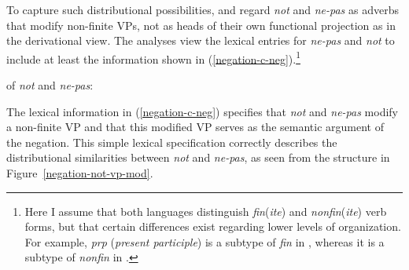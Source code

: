 \documentclass[output=paper,biblatex,babelshorthands,newtxmath,draftmode,colorlinks,citecolor=brown]{langscibook}
\begin{document}
\begin{exe}
\begin{xlist}
\begin{exe}
\begin{xlist}
\noindent
To capture such distributional possibilities, \citet{Kim:00} and \citet{KS:02} regard \textit{not} and \textit{ne-pas} as adverbs that modify
non-finite VPs, not as  heads of their own functional projection as in the derivational view. The
analyses view the lexical entries for \textit{ne-pas} and \textit{not} to include at
least the
information shown in (\ref{negation-c-neg}).\footnote{Here I assume that both languages
distinguish \textit{fin}(\textit{ite}) and \textit{nonfin}(\textit{ite}) verb forms, but that
certain differences exist regarding lower levels of organization. For example,
\textit{prp} (\textit{present participle}) is a subtype of \textit{fin} in ,
whereas it is a subtype of \textit{nonfin} in .}


\ea
\label{negation-c-neg}
\localvs of \emph{not} and \emph{ne-pas}:\\
\z

\noindent %
The lexical information in (\ref{negation-c-neg}) specifies that
\textit{not} and \textit{ne-pas} modify a non-finite VP and that this
modified VP serves as the semantic argument of the negation.
This simple lexical specification correctly describes the
distributional similarities between  \textit{not} and 
\textit{ne-pas}, as seen from the structure in Figure~\ref{negation-not-vp-mod}.


\end{xlist}
\end{exe}
\end{xlist}
\end{exe}
\end{document}
